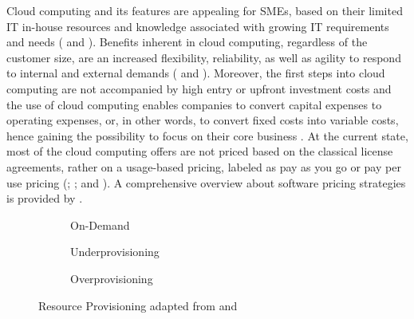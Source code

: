 Cloud computing and its features are appealing for \acp{SME}, based on their limited \ac{IT} in-house resources and knowledge associated with growing \ac{IT} requirements and needs (\citealp[p. 398]{Weinhardt2009} and \citealp{Karabek2011}). Benefits inherent in cloud computing, regardless of the customer size, are an increased flexibility, reliability, as well as agility to respond to internal and external demands (\citealp[p. 51]{Vaquero2009} and \citealp[p. 129]{Iyer2010}). Moreover, the first steps into cloud computing are not accompanied by high entry or upfront investment costs and the use of cloud computing enables companies to convert capital expenses to operating expenses, or, in other words, to convert fixed costs into variable costs, hence gaining the possibility to focus on their core business \citep[pp. 51-53]{Armbrust2010}. At the current state, most of the cloud computing offers are not priced based on the classical license agreements, rather on a usage-based pricing, labeled as pay as you go or pay per use pricing (\citealp[pp. 50-54]{Vaquero2009}; \citealp[pp. 51-53,58]{Armbrust2010}; and \citealp[p. 2]{Iyer2010}). A comprehensive overview about software pricing strategies is provided by \nolinebreak\citet{Lehmann2009}.

\begin{figure}[t]
	\centering
	\begin{subfigure}{.75\textwidth}
		\centering
		
		\caption{On-Demand}\label{fig:rpc}
	\end{subfigure}
	\begin{subfigure}[b]{.75\textwidth}
		\centering
		
		\caption{Underprovisioning}\label{fig:rpu}
	\end{subfigure}
	\begin{subfigure}[b]{.75\textwidth}
		\centering
		
		\caption{Overprovisioning}\label{fig:rpo}
	\end{subfigure}
	\caption[Resource Provisioning]{Resource Provisioning adapted from \citet[p. 54]{Armbrust2010} and \citet[p. 127]{Iyer2010}}
	\label{fig:rp}
\end{figure}

